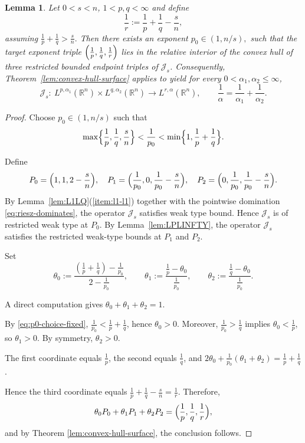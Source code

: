 \documentclass[12pt]{article}
\newtheorem{lemma}[theorem]{Lemma}
\theoremstyle{definition}
\theoremstyle{remark}
\numberwithin{equation}{section}
\begin{document}
\begin{lemma}\label{lem:three-point-geometry}
Let $0<s<n$, $1<p,q<\infty$ and define
\[
\frac1r:=\frac1p+\frac1q-\frac{s}{n},
\]
assuming $\frac1p+\frac1q>\frac{s}{n}.$
Then there exists an exponent $p_0\in(1,n/s),$ 
such that the target exponent triple
$\Bigl(\frac1p,\frac1q,\frac1r\Bigr)$
lies in the \emph{relative interior} of the convex hull of three restricted bounded endpoint triples of $\mathcal J_s$.
Consequently, Theorem~\ref{lem:convex-hull-surface} applies to yield for every $0<\alpha_1,\alpha_2\le\infty$,
\[
\mathcal J_s:\ L^{p,\alpha_1}(\mathbb R^n)\times L^{q,\alpha_2}(\mathbb R^n)\to L^{r,\alpha}(\mathbb R^n),
\qquad \frac1\alpha=\frac1{\alpha_1}+\frac1{\alpha_2}.
\]
\end{lemma}
\begin{proof}
Choose $p_0\in(1,n/s)$ such that
\begin{equation}\label{eq:p0-choice-fixed}
\max\Bigl\{\frac1p,\frac1q,\frac{s}{n}\Bigr\}
<
\frac1{p_0}
<
\min\Bigl\{1,\frac1p+\frac1q\Bigr\}.
\end{equation}

Define
\[
P_0=\Bigl(1,1,2-\frac{s}{n}\Bigr),\quad
P_1=\Bigl(\frac1{p_0},0,\frac1{p_0}-\frac{s}{n}\Bigr),\quad
P_2=\Bigl(0,\frac1{p_0},\frac1{p_0}-\frac{s}{n}\Bigr).
\]
By Lemma~\ref{lem:L1LQ}(\ref{item:l1-l1}) together with the pointwise domination
\eqref{eq:riesz-dominates}, the operator $\mathcal J_s$ satisfies weak type bound. Hence $\mathcal J_s$ is of restricted weak type at $P_0$.
By Lemma~\ref{lem:LPLINFTY}, the operator $\mathcal J_s$ satisfies the restricted weak-type bounds at $P_1$ and $P_2$.

Set
\[
\theta_0:=\frac{\left(\frac1p+\frac1q\right)-\frac1{p_0}}{2-\frac1{p_0}},
\qquad
\theta_1:=\frac{\frac1p-\theta_0}{\frac1{p_0}},
\qquad
\theta_2:=\frac{\frac1q-\theta_0}{\frac1{p_0}} .
\]

A direct computation gives
$\theta_0+\theta_1+\theta_2=1$. 

By \eqref{eq:p0-choice-fixed},
$\frac1{p_0}<\frac1p+\frac1q$, hence $\theta_0>0$.
Moreover, $\frac1{p_0}>\frac1q$ implies $\theta_0<\frac1p$, so
$\theta_1>0$. By symmetry, $\theta_2>0$.


The first coordinate equals $\frac1p$, the second equals $\frac1q$, and
$2\theta_0+\frac1{p_0}(\theta_1+\theta_2)
=\frac1p+\frac1q$.

Hence the third coordinate equals
$\frac1p+\frac1q-\frac{s}{n}=\frac1r$.
Therefore,
\[
\theta_0P_0+\theta_1P_1+\theta_2P_2
=\Bigl(\frac1p,\frac1q,\frac1r\Bigr),
\]
and by Theorem \ref{lem:convex-hull-surface}, the conclusion follows.
\end{proof}
\end{document}
